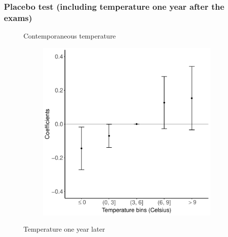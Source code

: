 \documentclass[10pt, pdfmx,hiresbb]{beamer}
\begin{document}
\begin{frame}\frametitle{Placebo test (including temperature one year after the exams)}
  \begin{figure}
    \begin{minipage}{0.49\textwidth}
      \begin{center}
        Contemporaneous temperature
      \end{center}
      \begin{figure}[h]
        \centering
        \includegraphics[width = \textwidth]{../Output/images/reg_placebo_exam_4.pdf}
      \end{figure}
    \end{minipage}
    \begin{minipage}{0.49\textwidth}
      \begin{center}
        Temperature one year later
      \end{center}
      \begin{figure}[h]

\end{figure}
\end{minipage}
\end{figure}
\end{frame}
\end{document}
